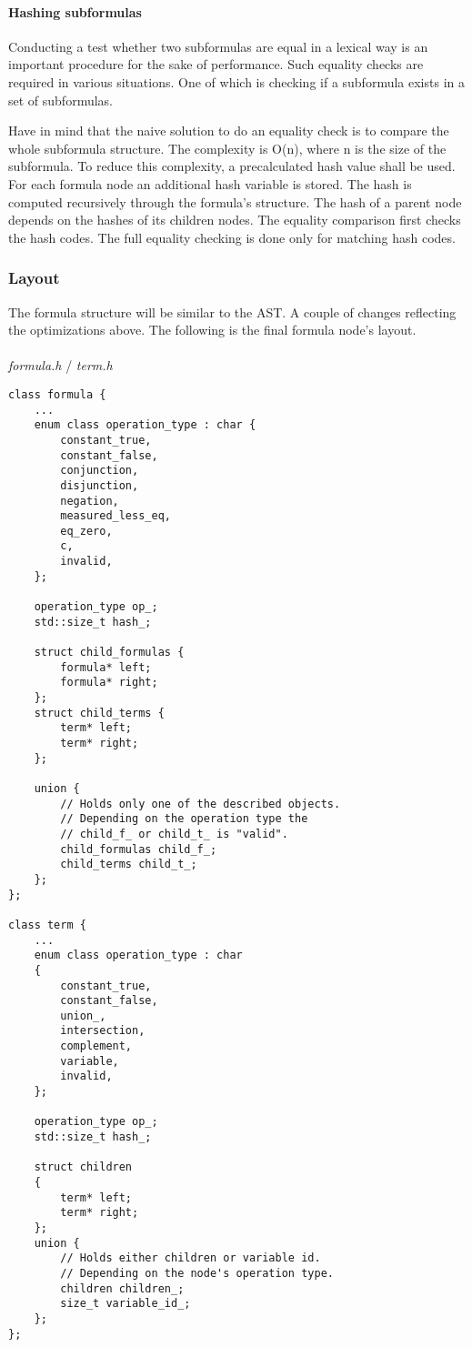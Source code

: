 \documentclass{article}
\begin{document}
	\paragraph{Hashing subformulas}
	Conducting a test whether two subformulas are equal in a lexical way is an important procedure for the sake of performance. Such equality checks are required in various situations. One of which is checking if a subformula exists in a set of subformulas.

	Have in mind that the naive solution to do an equality check is to compare the whole subformula structure. The complexity is O(n), where n is the size of the subformula. To reduce this complexity, a precalculated hash value shall be used.
	For each formula node an additional hash variable is stored. The hash is computed recursively through the formula's structure. The hash of a parent node depends on the hashes of its children nodes. 
	The equality comparison first checks the hash codes. The full equality checking is done only for matching hash codes.

	\newpage
	\subsubsection{Layout}
	The formula structure will be similar to the AST. A couple of changes reflecting the optimizations above. The following is the final formula node's layout.
	\\
	\\
\noindent
\textit{formula.h} / \textit{term.h}
\begin{lstlisting}
class formula {
    ...
    enum class operation_type : char {
        constant_true,
        constant_false,
        conjunction,
        disjunction,
        negation,
        measured_less_eq,
        eq_zero,
        c,
        invalid,
    };

    operation_type op_;
    std::size_t hash_;

    struct child_formulas {
        formula* left;
        formula* right;
    };
    struct child_terms {
        term* left;
        term* right;
    };

    union {
        // Holds only one of the described objects.
        // Depending on the operation type the
        // child_f_ or child_t_ is "valid".
        child_formulas child_f_;
        child_terms child_t_;
    };
};

class term {
    ...
    enum class operation_type : char
    {
        constant_true,
        constant_false,
        union_,
        intersection,
        complement,
        variable,
        invalid,
    };

    operation_type op_;
    std::size_t hash_;

    struct children
    {
        term* left;
        term* right;
    };
    union {
        // Holds either children or variable id.
        // Depending on the node's operation type.
        children children_;
        size_t variable_id_;
    };
};
\end{lstlisting}
\end{document}
